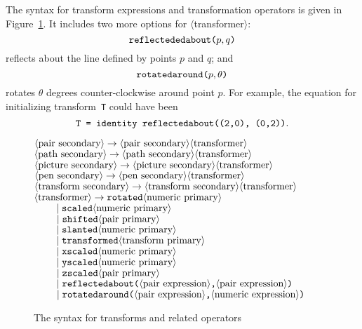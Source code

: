 \documentclass{article} %
\newcommand\descr[1]{{\langle\hbox{#1}\rangle}}
\newcommand\invisgap{\nobreak\hskip0pt\relax}
\newcommand\tdescr[1]{$\langle$\invisgap#1\invisgap$\rangle$}
\begin{document}
The syntax for transform expressions and transformation operators is given in
Figure~\ref{sytrans}.  It includes two more options for
\tdescr{transformer}:
$$ \hbox{\tt reflectededabout(}p, q\hbox{\tt )} $$
reflects about the line defined by points $p$ and $q$;
and
$$ \hbox{\tt rotatedaround(}p,\theta\hbox{\tt )} $$
rotates $\theta$ degrees counter-clockwise around point $p$.  For example,
the equation for initializing transform~{\tt T} could have been
$$ \hbox{\tt T = identity reflectedabout((2,0), (0,2))}. $$

\begin{figure}[htp]
\begin{ctabbing}
$\tt \descr{pair secondary} \rightarrow
        \descr{pair secondary} \descr{transformer}$\\
$\tt \descr{path secondary} \rightarrow
        \descr{path secondary} \descr{transformer}$\\
$\tt \descr{picture secondary} \rightarrow
        \descr{picture secondary} \descr{transformer}$\\
$\tt \descr{pen secondary} \rightarrow
        \descr{pen secondary} \descr{transformer}$\\
$\tt \descr{transform secondary} \rightarrow
        \descr{transform secondary} \descr{transformer}$\\[6pt]
$\tt \descr{transformer} \rightarrow rotated \descr{numeric primary}$\\
$\tt \qquad \;|\; scaled \descr{numeric primary}$\\
$\tt \qquad \;|\; shifted \descr{pair primary}$\\
$\tt \qquad \;|\; slanted \descr{numeric primary}$\\
$\tt \qquad \;|\; transformed \descr{transform primary}$\\
$\tt \qquad \;|\; xscaled \descr{numeric primary}$\\
$\tt \qquad \;|\; yscaled \descr{numeric primary}$\\
$\tt \qquad \;|\; zscaled \descr{pair primary}$\\
$\tt \qquad \;|\; reflectedabout\hbox{\tt (}\descr{pair expression}
        \hbox{\tt ,}\descr{pair expression}\hbox{\tt )}$\\
$\tt \qquad \;|\; rotatedaround\hbox{\tt (}\descr{pair expression}
        \hbox{\tt ,}\descr{numeric expression}\hbox{\tt )}$
\end{ctabbing}
\caption{The syntax for transforms and related operators}
\label{sytrans}
\end{figure}
\end{document}
